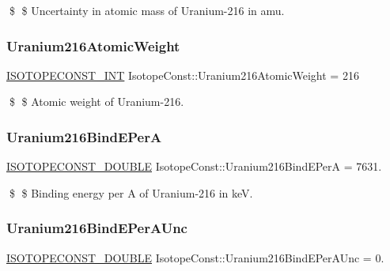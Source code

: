 \$ \$ Uncertainty in atomic mass of Uranium-\/216 in amu. \mbox{\label{group___isotope_const-_uranium-_u216_ga4cecb2d2bff3522be35a8a8ca037406c}} 
\subsubsection{\texorpdfstring{Uranium216\+Atomic\+Weight}{Uranium216AtomicWeight}}
{\footnotesize\ttfamily \mbox{\hyperlink{group___isotope_const-_macros_ga5f18360b3e99483a35c32d789e62621c}{I\+S\+O\+T\+O\+P\+E\+C\+O\+N\+S\+T\+\_\+\+I\+NT}} Isotope\+Const\+::\+Uranium216\+Atomic\+Weight = 216}

\$ \$ Atomic weight of Uranium-\/216. \mbox{\label{group___isotope_const-_uranium-_u216_ga2100ada28100311be1eaa2bb52344116}} 
\subsubsection{\texorpdfstring{Uranium216\+Bind\+E\+PerA}{Uranium216BindEPerA}}
{\footnotesize\ttfamily \mbox{\hyperlink{group___isotope_const-_macros_ga8f45a7272ce02c0b4c65c44636ed719a}{I\+S\+O\+T\+O\+P\+E\+C\+O\+N\+S\+T\+\_\+\+D\+O\+U\+B\+LE}} Isotope\+Const\+::\+Uranium216\+Bind\+E\+PerA = 7631.}

\$ \$ Binding energy per A of Uranium-\/216 in keV. \mbox{\label{group___isotope_const-_uranium-_u216_gae2cfbb9715483ed2a5fd83ead8ff181e}} 
\subsubsection{\texorpdfstring{Uranium216\+Bind\+E\+Per\+A\+Unc}{Uranium216BindEPerAUnc}}
{\footnotesize\ttfamily \mbox{\hyperlink{group___isotope_const-_macros_ga8f45a7272ce02c0b4c65c44636ed719a}{I\+S\+O\+T\+O\+P\+E\+C\+O\+N\+S\+T\+\_\+\+D\+O\+U\+B\+LE}} Isotope\+Const\+::\+Uranium216\+Bind\+E\+Per\+A\+Unc = 0.}


